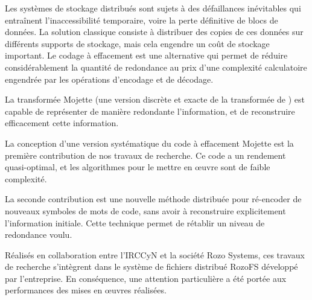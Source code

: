 
Les systèmes de stockage distribués sont sujets à des défaillances inévitables
qui entraînent l'inaccessibilité temporaire, voire la perte définitive de blocs
de données. La solution classique consiste à distribuer des copies de ces
données sur différents supports de stockage, mais cela engendre un coût de
stockage important.
%
Le codage à effacement est une alternative qui permet de réduire
considérablement la quantité de redondance au prix d'une complexité
calculatoire engendrée par les opérations d'encodage et de décodage.

La transformée Mojette (une version discrète et exacte de la transformée
de \radon) est capable de représenter de manière redondante l'information,
et de reconstruire efficacement cette information. %

La conception d'une version systématique du code à effacement Mojette est la
première contribution de nos travaux de recherche. Ce code a un rendement
quasi-optimal, et les algorithmes pour le mettre en œuvre sont de faible
complexité.

La seconde contribution est une nouvelle méthode distribuée pour ré-encoder de
nouveaux symboles de mots de code, sans avoir à reconstruire explicitement
l'information initiale. Cette technique permet de rétablir un niveau de
redondance voulu.

Réalisés en collaboration entre l'IRCCyN et la société Rozo Systems, ces
travaux de recherche s'intègrent dans le système de fichiers
distribué RozoFS développé par l'entreprise. En conséquence, une attention
particulière a été portée aux performances des mises en œuvres réalisées.

